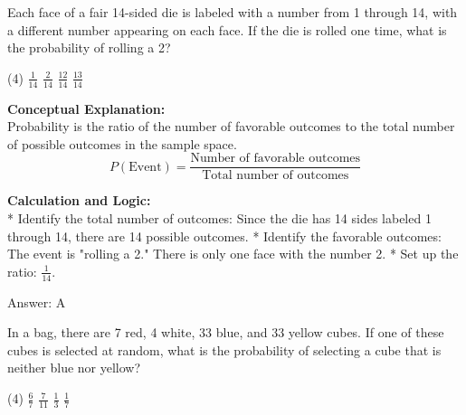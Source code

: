 \documentclass[11pt,paper=a4,answers]{exam}
\begin{document}
\begin{questions}
\pointsinrightmargin
\pointsdroppedatright
\marksnotpoints
{}
\pointformat{\boldmath\themarginpoints}
\bracketedpoints



\question
Each face of a fair 14-sided die is labeled with a number from 1 through 14, with a different number appearing on each face. If the die is rolled one time, what is the probability of rolling a 2?
\begin{tasks}(4)
    \task $\frac{1}{14}$
    \task $\frac{2}{14}$
    \task $\frac{12}{14}$
    \task $\frac{13}{14}$
\end{tasks}

\begin{solution}
\textbf{Conceptual Explanation:} \\
Probability is the ratio of the number of favorable outcomes to the total number of possible outcomes in the sample space.
\[ P(\text{Event}) = \frac{\text{Number of favorable outcomes}}{\text{Total number of outcomes}} \]

\vspace{30pt}

\textbf{Calculation and Logic:} \\
* Identify the total number of outcomes: Since the die has 14 sides labeled 1 through 14, there are 14 possible outcomes.
* Identify the favorable outcomes: The event is "rolling a 2." There is only one face with the number 2.
* Set up the ratio: $\frac{1}{14}$.

\vspace{30pt}

Answer: \colorbox{yellow!100}{A}
\end{solution}

\vspace{60pt}

\question
In a bag, there are 7 red, 4 white, 33 blue, and 33 yellow cubes. If one of these cubes is selected at random, what is the probability of selecting a cube that is neither blue nor yellow?
\begin{tasks}(4)
    \task $\frac{6}{7}$
    \task $\frac{7}{11}$
    \task $\frac{1}{3}$
    \task $\frac{1}{7}$
\end{tasks}


\end{questions}
\end{document}
